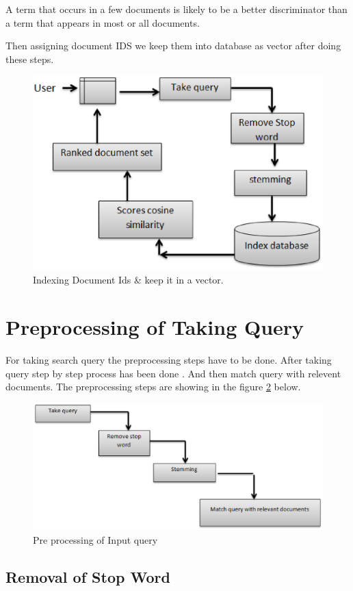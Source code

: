 A term that occurs in a few documents is likely to be a better discriminator than a term that appears in most or all documents.

Then assigning document IDS we keep them into database as vector after doing these steps.


\begin{figure}[htp]
	\centering
		\includegraphics[width=.65\textwidth]{figure/two.eps}
	\caption{Indexing Document Ids \& keep it in a vector.}
	\label{Figure:indexing}
\end{figure}


\section{Preprocessing of Taking Query}

For taking search query the preprocessing steps have to be done. After taking query step by step process has been done . And then match query with relevent documents. The preprocessing steps are showing in the figure \ref{Figure:inquery} below.


\begin{figure}[htp]
	\centering
		\includegraphics[width=.65\textwidth]{figure/three.eps}
	\caption{Pre processing of Input query}
	\label{Figure:inquery}
\end{figure}


\subsection{Removal of Stop Word}


